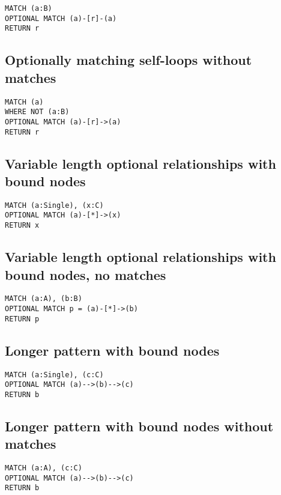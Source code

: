 \begin{lstlisting}
MATCH (a:B)
OPTIONAL MATCH (a)-[r]-(a)
RETURN r
\end{lstlisting}

\subsection{Optionally matching self-loops without matches}

\begin{lstlisting}
MATCH (a)
WHERE NOT (a:B)
OPTIONAL MATCH (a)-[r]->(a)
RETURN r
\end{lstlisting}

\subsection{Variable length optional relationships with bound nodes}

\begin{lstlisting}
MATCH (a:Single), (x:C)
OPTIONAL MATCH (a)-[*]->(x)
RETURN x
\end{lstlisting}

\subsection{Variable length optional relationships with bound nodes, no matches}

\begin{lstlisting}
MATCH (a:A), (b:B)
OPTIONAL MATCH p = (a)-[*]->(b)
RETURN p
\end{lstlisting}

\subsection{Longer pattern with bound nodes}

\begin{lstlisting}
MATCH (a:Single), (c:C)
OPTIONAL MATCH (a)-->(b)-->(c)
RETURN b
\end{lstlisting}

\subsection{Longer pattern with bound nodes without matches}

\begin{lstlisting}
MATCH (a:A), (c:C)
OPTIONAL MATCH (a)-->(b)-->(c)
RETURN b
\end{lstlisting}

